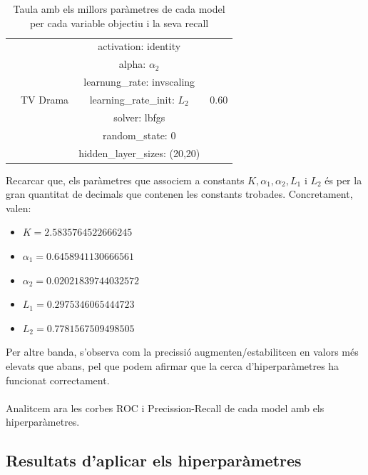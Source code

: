 \documentclass[a4paper, 11pt]{article}
\begin{document}
\begin{table}[h]
\begin{tabular}{c|c|c|c}
       & \multirow{7}{*}{TV Drama} & activation: identity & \multirow{7}{*}{0.60}\\
       && alpha: $\alpha_2$ &\\
        && learnung\_rate: invscaling &\\
        && learning\_rate\_init: $L_2$ &\\
        && solver: lbfgs &\\
        && random\_state: 0&\\
        && hidden\_layer\_sizes: (20,20) &\\
    \end{tabular}
    \caption{Taula amb els millors paràmetres de cada model per cada variable objectiu i la seva recall}
    \label{tab:my_label}
\end{table}
Recarcar que, els paràmetres que associem a constants $K, \alpha_1, \alpha_2, L_1$ i $L_2$ és per la gran quantitat de decimals que contenen les constants trobades. Concretament, valen:
\begin{itemize}
    \item $K= 2.5835764522666245$
    \item $\alpha_1= 0.6458941130666561$
    \item $\alpha_2= 0.02021839744032572$
    \item $L_1= 0.2975346065444723$
    \item $L_2= 0.7781567509498505$
\end{itemize}
Per altre banda, s'observa com la precissió augmenten/estabilitcen en valors més elevats que abans, pel que podem afirmar que la cerca d'hiperparàmetres ha funcionat correctament.\\\\
Analitcem ara les corbes ROC i Precission-Recall de cada model amb els hiperparàmetres.
\subsection{Resultats d'aplicar els hiperparàmetres}
\end{document}
